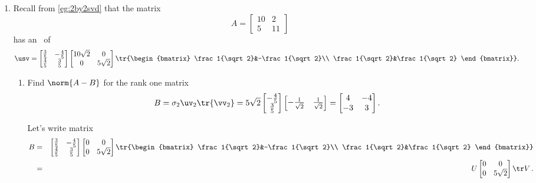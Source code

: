\begin{example}
\begin{enumerate}
\item Recall from \autoref{eg:2by2svd} that the matrix
\begin{equation*}
A=\begin{bmatrix} 10&2\\5&11 \end{bmatrix}
\end{equation*}
has an \svd\ of
\begin{equation*}
\usv=\begin{bmatrix} \frac35&-\frac45\\\frac45&\frac35 \end{bmatrix}
\begin{bmatrix} 10\sqrt2&0\\0&5\sqrt2 \end{bmatrix}
\tr{\begin{bmatrix} \frac1{\sqrt2}&-\frac1{\sqrt2}\\ \frac1{\sqrt2}&\frac1{\sqrt2} \end{bmatrix}}.
\end{equation*}
\begin{enumerate}
\item Find \(\norm{A-B}\) for the rank one matrix 
\begin{equation*}
B=\sigma_2\uv_2\tr{\vv_2}
=5\sqrt2\begin{bmatrix} -\frac45\\\frac35 \end{bmatrix}
\begin{bmatrix} -\frac1{\sqrt2}&\frac1{\sqrt2} \end{bmatrix}
=\begin{bmatrix} 4&-4\\-3&3 \end{bmatrix}.
\end{equation*}
\begin{solution} 
Let's write matrix
\begin{eqnarray*}
B&=&\begin{bmatrix} \frac35&-\frac45\\\frac45&\frac35 \end{bmatrix}
\begin{bmatrix} 0&0\\0&5\sqrt2 \end{bmatrix}
\tr{\begin{bmatrix} \frac1{\sqrt2}&-\frac1{\sqrt2}\\ \frac1{\sqrt2}&\frac1{\sqrt2} \end{bmatrix}}
\\&=&U\begin{bmatrix} 0&0\\0&5\sqrt2 \end{bmatrix}\tr V\,.

\end{eqnarray*}
\end{solution}
\end{enumerate}
\end{enumerate}
\end{example}

